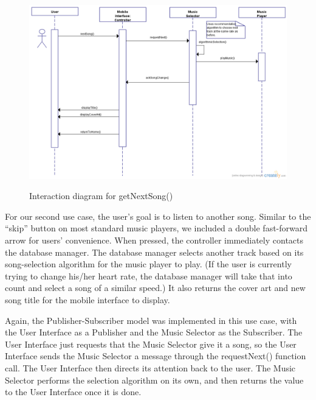 \documentclass[letterpaper,english, 12pt]{scrreprt}
\begin{document}
\begin{figure}[H]
	\centering
	\includegraphics[scale=.40]{img/Interaction_Diagrams/newUC3.png}\\
	\caption {Interaction diagram for getNextSong()} 
\end{figure}

For our second use case, the user's goal is to listen to another song. Similar to the ``skip'' button on most standard music players, we included a double fast-forward arrow for users' convenience. When pressed, the controller immediately contacts the database manager. The database manager selects another track based on its song-selection algorithm for the music player to play. (If the user is currently trying to change his/her heart rate, the database manager will take that into count and select a song of a similar speed.) It also returns the cover art and new song title for the mobile interface to display.

Again, the Publisher-Subscriber model was implemented in this use case, with the User Interface as a Publisher and the Music Selector as the Subscriber. The User Interface just requests that the Music Selector give it a song, so the User Interface sends the Music Selector a message through the requestNext() function call. The User Interface then directs its attention back to the user. The Music Selector performs the selection algorithm on its own, and then returns the value to the User Interface once it is done.
\end{document}
